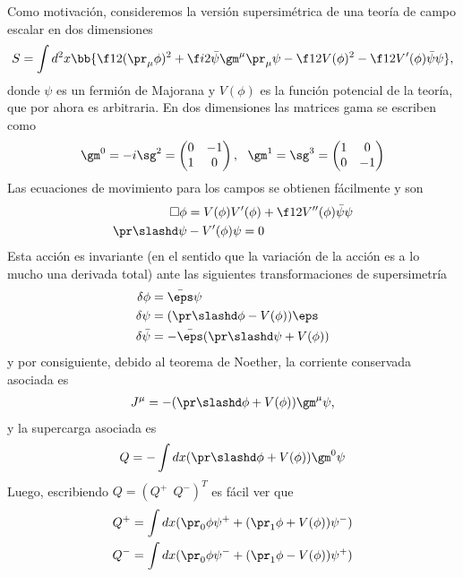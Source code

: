 Como motivación, consideremos la versión supersimétrica de una teoría de campo escalar en dos dimensiones
\begin{align}
	S = \int d^2x\bb{\f 12(\pr_\mu\phi)^2+\f i2\bar\psi\gm^\mu\pr_\mu\psi-\f 12V(\phi)^2-\f 12V'(\phi)\bar\psi\psi},
\end{align}
donde $\psi$ es un fermión de Majorana y $V(\phi)$ es la función potencial de la teoría, que por ahora es arbitraria. En dos dimensiones las matrices gama se escriben como
\begin{align}
	\gm^0 = -i\sg^2 = \begin{pmatrix}
	0 & -1 \\ 1 & 0
	\end{pmatrix}, \ \ \gm^1 = \sg^3 = \begin{pmatrix}
	1 & 0\\ 0 & -1
	\end{pmatrix}
\end{align}
Las ecuaciones de movimiento para los campos se obtienen fácilmente y son
\begin{align}
	\Box\phi &= V(\phi)V'(\phi)+\f 12V''(\phi)\bar\psi\psi \label{eq:5.1.0.3}\\
	\pr\slashd\psi &- V'(\phi)\psi =0 \label{eq:5.1.0.4}
\end{align}
Esta acción es invariante (en el sentido que la variación de la acción es a lo mucho una derivada total) ante las siguientes transformaciones de supersimetría
\begin{align}
	\delta\phi &= \bar\eps\psi\\
	\delta\psi &= (\pr\slashd\phi-V(\phi))\eps \label{eq:5.1.0.6}\\
	\delta\bar\psi &= -\bar\eps(\pr\slashd\psi+V(\phi))
\end{align}
y por consiguiente, debido al teorema de Noether, la corriente conservada asociada es
\begin{align}
	J^\mu = -(\pr\slashd\phi+V(\phi))\gm^\mu\psi,
\end{align}
y la supercarga asociada es
\begin{align}
	Q = -\int dx(\pr\slashd\phi+V(\phi))\gm^0\psi
\end{align}
Luego, escribiendo $Q=(Q^+ \ \ Q^-)^T$ es fácil ver que
\begin{align}
	Q^+ &= \int dx(\pr_0\phi\psi^++(\pr_1\phi+V(\phi))\psi^-) \label{eq:5.1.0.10}\\
	Q^- &= \int dx(\pr_0\phi\psi^-+(\pr_1\phi-V(\phi))\psi^+) \label{eq:5.1.0.11}
\end{align}
